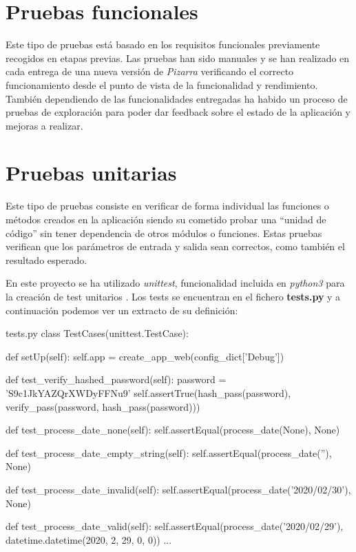 \documentclass[11pt,spanish,listoffigures,listoftables]{tfgetsinf}
\begin{document}
\section{Pruebas funcionales}

Este tipo de pruebas está basado en los requisitos funcionales previamente recogidos en etapas previas. Las pruebas han sido manuales y se han realizado en cada entrega de una nueva versión de \textit{Pizarra} verificando el correcto funcionamiento desde el punto de vista de la funcionalidad y rendimiento. También dependiendo de las funcionalidades entregadas ha habido un proceso de pruebas de exploración para poder dar feedback sobre el estado de la aplicación y mejoras a realizar.

\section{Pruebas unitarias}

Este tipo de pruebas consiste en verificar de forma individual las funciones o métodos creados en la aplicación siendo su cometido probar una ``unidad de código'' sin tener dependencia de otros módulos o funciones. Estas pruebas verifican que los parámetros de entrada y salida sean correctos, como también el resultado esperado.

En este proyecto se ha utilizado \textit{unittest}, funcionalidad incluida en \textit{python3} para la creación de test unitarios \cite{book-python-testing}. Los tests se encuentran en el fichero \textbf{tests.py} y a continuación podemos ver un extracto de su definición: \newline

\begin{code}{tests.py}
class TestCases(unittest.TestCase):

	def setUp(self):
		self.app = create_app_web(config_dict['Debug'])
	
	def test_verify_hashed_password(self):
		password = 'S9c1JkYAZQrXWDyFFNu9'
		self.assertTrue(hash_pass(password), verify_pass(password, hash_pass(password)))
		
	def test_process_date_none(self):
		self.assertEqual(process_date(None), None)
	
	def test_process_date_empty_string(self):
		self.assertEqual(process_date(''), None)
	
	def test_process_date_invalid(self):
		self.assertEqual(process_date('2020/02/30'), None)
	
	def test_process_date_valid(self):
		self.assertEqual(process_date('2020/02/29'), datetime.datetime(2020, 2, 29, 0, 0))
...
\end{code}
\end{document}
